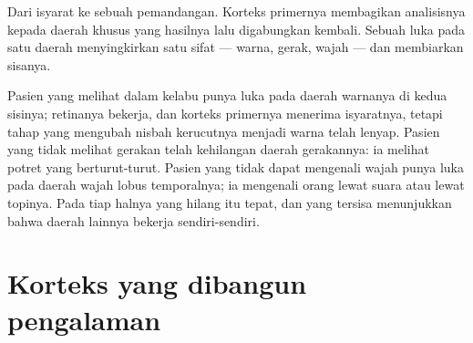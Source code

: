 \begin{omfigure}

{\small Dari isyarat ke sebuah pemandangan. Korteks primernya
membagikan analisisnya kepada daerah khusus yang hasilnya lalu
digabungkan kembali. Sebuah luka pada satu daerah menyingkirkan satu
sifat --- warna, gerak, wajah --- dan membiarkan sisanya.}
\end{omfigure}

\begin{example}\label{ex:g11:vision-and-brain:patients}
Pasien yang melihat dalam kelabu punya luka pada daerah warnanya di
kedua sisinya;  retinanya bekerja, dan korteks primernya
menerima isyaratnya, tetapi tahap yang mengubah nisbah kerucutnya
menjadi warna telah lenyap. Pasien yang tidak melihat gerakan telah
kehilangan daerah gerakannya: ia melihat potret yang berturut-turut.
Pasien yang tidak dapat mengenali wajah punya luka pada daerah wajah
lobus temporalnya; ia mengenali orang lewat suara atau lewat topinya.
Pada tiap halnya yang hilang itu tepat, dan yang tersisa menunjukkan
bahwa daerah lainnya bekerja sendiri-sendiri.
\end{example}

\section{Korteks yang dibangun pengalaman}


